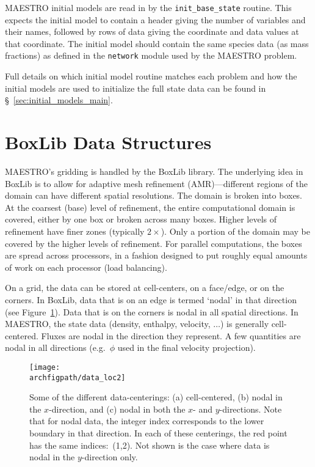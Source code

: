 MAESTRO initial models are read in by the {\tt init\_base\_state}
routine.  This expects the initial model to contain a header giving
the number of variables and their names, followed by rows of data
giving the coordinate and data values at that coordinate.  The initial
model should contain the same species data (as mass fractions) as
defined in the {\tt network} module used by the MAESTRO problem.

Full details on which initial model routine matches each problem and
how the initial models are used to initialize the full state data can
be found in \S~\ref{sec:initial_models_main}.



\section{BoxLib Data Structures}

MAESTRO's gridding is handled by the BoxLib library.  The underlying
idea in BoxLib is to allow for adaptive mesh refinement (AMR)---different
regions of the domain can have different spatial resolutions.  The
domain is broken into boxes.  At the coarsest (base) level of
refinement, the entire computational domain is covered, either by one
box or broken across many boxes.  Higher levels of refinement have
finer zones (typically $2\times$).  Only a portion of the domain may
be covered by the higher levels of refinement.  
For parallel computations, the boxes are spread across processors, in
a fashion designed to put roughly equal amounts of work on each
processor (load balancing).

On a grid, the data can be stored at cell-centers, on a face/edge, or
on the corners.  In BoxLib, data that is on an edge is termed `nodal'
in that direction (see Figure~\ref{fig:dataloc}).  Data that is on the
corners is nodal in all spatial directions.  In MAESTRO, the state
data (density, enthalpy, velocity, $\ldots$) is generally
cell-centered.  Fluxes are nodal in the direction they represent.
A few quantities are nodal in all directions (e.g.\ $\phi$ used in
the final velocity projection).

\begin{figure}[h]
\centering
\texttt{[image: \\archfigpath/data\_loc2]}
\caption[Data-centerings on the grid]
  {\label{fig:dataloc} Some of the different data-centerings:
  (a) cell-centered, (b) nodal in the $x$-direction, and (c) nodal in
  both the $x$- and $y$-directions.  Note that for nodal data, the
  integer index corresponds to the lower boundary in that direction.
  In each of these centerings, the red point has the same indices:\ (1,2).
  Not shown is the case where data is nodal in the $y$-direction only.}
\end{figure}



